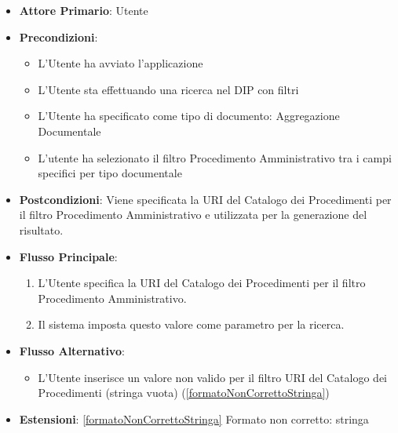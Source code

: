 \begin{itemize}
      \item \textbf{Attore Primario}: Utente
      \item \textbf{Precondizioni}: 
      \begin{itemize}            
            \item L'Utente ha avviato l'applicazione
            \item L'Utente sta effettuando una ricerca nel DIP con filtri
            \item L'Utente ha specificato come tipo di documento: Aggregazione Documentale
            \item L'utente ha selezionato il filtro Procedimento Amministrativo tra i campi specifici per tipo documentale
      \end{itemize}
      \item \textbf{Postcondizioni}: Viene specificata la URI del Catalogo dei Procedimenti per il filtro Procedimento Amministrativo e utilizzata per la generazione del risultato.
      \item \textbf{Flusso Principale}:
      \begin{enumerate}
            \item L'Utente specifica la URI del Catalogo dei Procedimenti per il filtro Procedimento Amministrativo.
            \item Il sistema imposta questo valore come parametro per la ricerca.
      \end{enumerate}
      \item \textbf{Flusso Alternativo}:
      \begin{itemize}
            \item L'Utente inserisce un valore non valido per il filtro URI del Catalogo dei Procedimenti (stringa vuota) (\ref{formatoNonCorrettoStringa})
      \end{itemize}
      \item \textbf{Estensioni}: \ref{formatoNonCorrettoStringa} Formato non corretto: stringa
\end{itemize}
      
